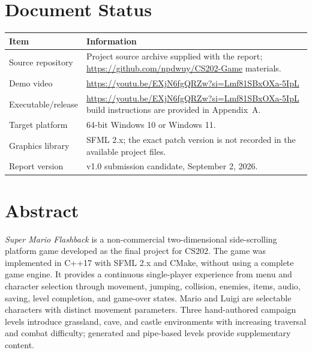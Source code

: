 \documentclass{template}
\begin{document}

\section*{Document Status}

\begin{tabularx}{\textwidth}{@{}lX@{}}
    \toprule
    \textbf{Item} & \textbf{Information} \\
    \midrule
    Source repository & Project source archive supplied with the report;
    \url{https://github.com/npdwuy/CS202-Game}
    materials. \\
    Demo video & \url{https://youtu.be/EXjN6fgQRZw?si=Lmf81SBxOXa-5IpL} \\
    Executable/release & \url{https://youtu.be/EXjN6fgQRZw?si=Lmf81SBxOXa-5IpL} build
    instructions are provided in Appendix~A. \\
    Target platform & 64-bit Windows 10 or Windows 11. \\
    Graphics library & SFML 2.x; the exact patch version is not recorded in the
    available project files. \\
    Report version & v1.0 submission candidate, September 2, 2026. \\
    \bottomrule
\end{tabularx}

\section*{Abstract}

\textit{Super Mario Flashback} is a non-commercial two-dimensional
side-scrolling platform game developed as the final project for CS202. The game
was implemented in C++17 with SFML 2.x and CMake, without using a complete game
engine. It provides a continuous single-player experience from menu and
character selection through movement, jumping, collision, enemies, items,
audio, saving, level completion, and game-over states. Mario and Luigi are
selectable characters with distinct movement parameters. Three hand-authored
campaign levels introduce grassland, cave, and castle environments with
increasing traversal and combat difficulty; generated and pipe-based levels
provide supplementary content.
\end{document}
